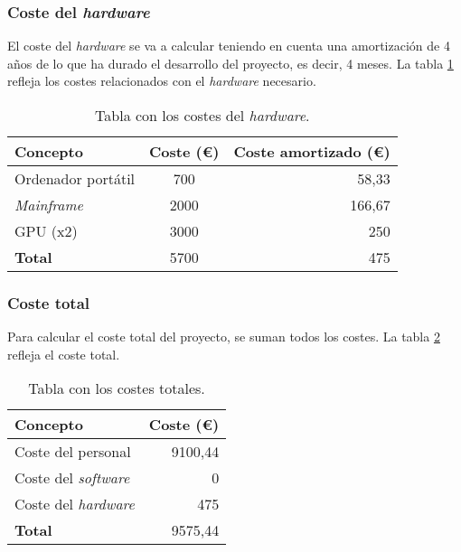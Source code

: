 \subsubsection{Coste del \textit{hardware}}
El coste del \textit{hardware} se va a calcular teniendo en cuenta una amortización de 4 años de lo que ha durado el desarrollo del proyecto, es decir, 4 meses. La tabla \ref{tab:coste_hardware} refleja los costes relacionados con el \textit{hardware} necesario.

\begin{table}[h]
	\begin{center}
		\begin{tabular}{ l c r }
			\toprule
			\textbf{Concepto} & \textbf{Coste (€)} & \textbf{Coste amortizado (€)} \\ \midrule
			Ordenador portátil & 700 & 58,33 \\
			\textit{Mainframe} & 2000 & 166,67 \\
			GPU (x2) & 3000 & 250 \\ \midrule
			\textbf{Total} & 5700 & 475 \\ \bottomrule
		\end{tabular}
		\caption{Tabla con los costes del \textit{hardware}.}
		\label{tab:coste_hardware}
	\end{center}
\end{table}

\subsubsection{Coste total}
Para calcular el coste total del proyecto, se suman todos los costes. La tabla \ref{tab:coste_total} refleja el coste total.

\begin{table}[h]
	\begin{center}
		\begin{tabular}{ l r }
			\toprule
			\textbf{Concepto} & \textbf{Coste (€)} \\ \midrule
			Coste del personal & 9100,44 \\
			Coste del \textit{software} & 0 \\
			Coste del \textit{hardware} & 475 \\\midrule
			\textbf{Total} & 9575,44 \\ \bottomrule
		\end{tabular}
		\caption{Tabla con los costes totales.}
		\label{tab:coste_total}
	\end{center}
\end{table}

